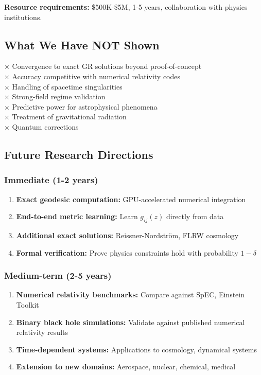 \documentclass[11pt,a4paper]{article}
\begin{document}
\textbf{Resource requirements:} \$500K-\$5M, 1-5 years, collaboration with physics institutions.

\subsection{What We Have NOT Shown}

$\times$ Convergence to exact GR solutions beyond proof-of-concept\\
$\times$ Accuracy competitive with numerical relativity codes\\
$\times$ Handling of spacetime singularities\\
$\times$ Strong-field regime validation\\
$\times$ Predictive power for astrophysical phenomena\\
$\times$ Treatment of gravitational radiation\\
$\times$ Quantum corrections

\subsection{Future Research Directions}

\subsubsection{Immediate (1-2 years)}

\begin{enumerate}
\item \textbf{Exact geodesic computation:} GPU-accelerated numerical integration
\item \textbf{End-to-end metric learning:} Learn $g_{ij}(z)$ directly from data
\item \textbf{Additional exact solutions:} Reissner-Nordström, FLRW cosmology
\item \textbf{Formal verification:} Prove physics constraints hold with probability $1-\delta$
\end{enumerate}

\subsubsection{Medium-term (2-5 years)}

\begin{enumerate}
\item \textbf{Numerical relativity benchmarks:} Compare against SpEC, Einstein Toolkit
\item \textbf{Binary black hole simulations:} Validate against published numerical relativity results
\item \textbf{Time-dependent systems:} Applications to cosmology, dynamical systems
\item \textbf{Extension to new domains:} Aerospace, nuclear, chemical, medical
\end{enumerate}
\end{document}
